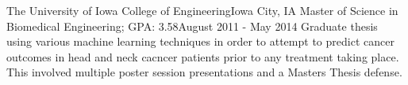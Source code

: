 \resumePosition
    {The University of Iowa College of Engineering}{Iowa City, IA}
    {Master of Science in Biomedical Engineering;  GPA: 3.58}{August 2011 - May 2014}
\resumeItemListStart
    {
        Graduate thesis using various machine learning techniques in order to attempt to predict cancer outcomes in head and neck cacncer patients prior to any treatment taking place.
        This involved multiple poster session presentations and a Masters Thesis defense.
    }
\resumeItemListEnd